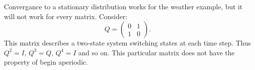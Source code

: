 \documentclass[12pt]{article}
\begin{document}
\begin{example}
  Convergance to a stationary distribution works for the weather
  example, but it will not work for every matrix.
Consider:
\[
    Q =
    \begin{pmatrix}
        0 & 1 \\
        1 & 0
    \end{pmatrix}
    .
\] This matrix describes a two-state system switching states at each
time step.  Thus \( Q^2 = I \), \( Q^3=Q \), \( Q^4=I \) and so on.
This particular matrix does not have the property of begin aperiodic.
\end{example}



\end{document}
